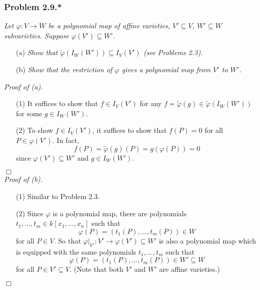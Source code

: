 \documentclass{article}
\begin{document}
\subsubsection*{Problem 2.9.*}
\emph{Let $\varphi: V \to W$ be a polynomial map of affine varieties,
$V' \subseteq V$, $W' \subseteq W$ subvarieties.
Suppose $\varphi(V') \subseteq W'$.}
\begin{enumerate}
\item[(a)]
  \emph{Show that $\widetilde{\varphi} (I_W(W')) \subseteq I_V(V')$ (see Problems 2.3).}

\item[(b)]
  \emph{Show that the restriction of $\varphi$ gives a polynomial map from $V'$ to $W'$.} \\
\end{enumerate}



\emph{Proof of (a).}
\begin{enumerate}
\item[(1)]
  It suffices to show that $f \in I_V(V')$
  for any $f = \widetilde{\varphi}(g) \in \widetilde{\varphi} (I_W(W'))$
  for some $g \in I_W(W')$.

\item[(2)]
  To show $f \in I_V(V')$, it suffices to show that $f(P) = 0$ for all $P \in \varphi(V')$.
  In fact,
  \[
    f(P) = \widetilde{\varphi}(g)(P) = g(\varphi(P)) = 0
  \]
  since $\varphi(V') \subseteq W'$ and $g \in I_W(W')$.
\end{enumerate}
$\Box$ \\



\emph{Proof of (b).}
\begin{enumerate}
\item[(1)]
  Similar to Problem 2.3.

\item[(2)]
  Since $\varphi$ is a polynomial map,
  there are polynomials $t_1,\ldots,t_m \in k[x_1,\ldots,x_n]$
  such that
  \[
    \varphi(P) = (t_1(P),\ldots,t_m(P)) \in W
  \]
  for all $P \in V$.
  So that $\varphi|_{V'}: V' \to \varphi(V') \subseteq W'$ is also a polynomial map
  which is equipped with the same polynomials $t_1,\ldots,t_m$
  such that
  \[
    \varphi(P) = (t_1(P),\ldots,t_m(P)) \in W' \subseteq W
  \]
  for all $P \in V' \subseteq V$.
  (Note that both $V'$ and $W'$ are affine varieties.)
\end{enumerate}
$\Box$ \\\\
\end{document}
